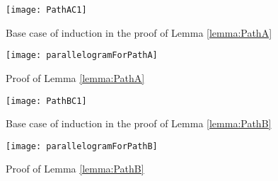 \documentclass[a4paper,UKenglish]{lipics}
\begin{document}
	

\begin{figure}[h]
	\centering
	\texttt{[image: PathAC1]}
	\caption{Base case of induction in the proof of Lemma \ref{lemma:PathA}}
	\label{fig:PathAClause1}
\end{figure}

\begin{figure}
	\centering
	\texttt{[image: parallelogramForPathA]}
	\caption{Proof of Lemma \ref{lemma:PathA}}
	\label{fig:PathA}
\end{figure}
	




\begin{figure}[h]
	\centering
	\texttt{[image: PathBC1]}
	\caption{Base case of induction in the proof of Lemma \ref{lemma:PathB} }
	\label{fig:PathBBaseCase}
\end{figure}



\begin{figure}

	\centering
	\texttt{[image: parallelogramForPathB]}
	\caption{Proof of Lemma \ref{lemma:PathB}}
	\label{fig:PathB}
\end{figure}
\end{document}
